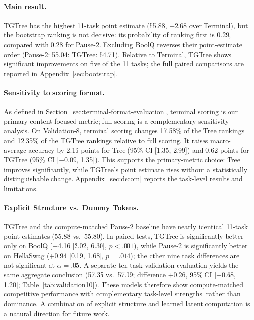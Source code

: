 \documentclass[11pt]{article}
\begin{document}
\paragraph{Main result.}
TGTree has the highest 11-task point estimate (55.88, +2.68 over Terminal), but the bootstrap ranking is not decisive: its probability of ranking first is 0.29, compared with 0.28 for Pause-2. Excluding BoolQ reverses their point-estimate order (Pause-2: 55.04; TGTree: 54.71). Relative to Terminal, TGTree shows significant improvements on five of the 11 tasks; the full paired comparisons are reported in Appendix~\ref{sec:bootstrap}.

\paragraph{Sensitivity to scoring format.}
As defined in Section~\ref{sec:terminal-format-evaluation}, terminal scoring is our primary content-focused metric; full scoring is a complementary sensitivity analysis. On Validation-8, terminal scoring changes 17.58\% of the Tree rankings and 12.35\% of the TGTree rankings relative to full scoring. It raises macro-average accuracy by 2.16 points for Tree (95\% CI [1.35, 2.99]) and 0.62 points for TGTree (95\% CI [$-$0.09, 1.35]). This supports the primary-metric choice: Tree improves significantly, while TGTree's point estimate rises without a statistically distinguishable change. Appendix~\ref{sec:decom} reports the task-level results and limitations.

\paragraph{Explicit Structure vs.\  Dummy Tokens.}
TGTree and the compute-matched Pause-2 baseline have nearly identical 11-task point estimates (55.88 vs.\ 55.80). In paired tests, TGTree is significantly better only on BoolQ (+4.16 [2.02, 6.30], $p<.001$), while Pause-2 is significantly better on HellaSwag (+0.94 [0.19, 1.68], $p=.014$); the other nine task differences are not significant at $\alpha=.05$. A separate ten-task validation evaluation yields the same aggregate conclusion (57.35 vs.\ 57.09; difference +0.26, 95\% CI [$-$0.68, 1.20]; Table~\ref{tab:validation10}). These models therefore show compute-matched competitive performance with complementary task-level strengths, rather than dominance. A combination of explicit structure and learned latent computation is a natural direction for future work.
\end{document}
